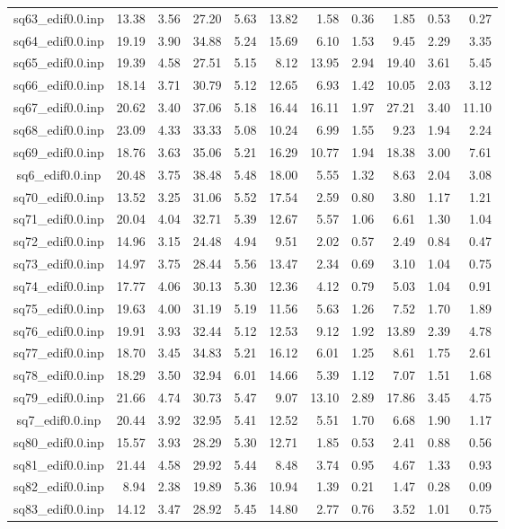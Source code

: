 {\begin{longtable}{@{}cr@{\hspace{1em}}r@{\hspace{1em}}r@{\hspace{1em}}r@{\hspace{1em}}r@{\hspace{2em}}r@{\hspace{1em}}r@{\hspace{1em}}r@{\hspace{1em}}r@{\hspace{1em}}r@{}}
sq63\_edif0.0.inp&13.38&3.56&27.20&5.63&13.82&1.58&0.36&1.85&0.53&0.27\\
sq64\_edif0.0.inp&19.19&3.90&34.88&5.24&15.69&6.10&1.53&9.45&2.29&3.35\\
sq65\_edif0.0.inp&19.39&4.58&27.51&5.15&8.12&13.95&2.94&19.40&3.61&5.45\\
sq66\_edif0.0.inp&18.14&3.71&30.79&5.12&12.65&6.93&1.42&10.05&2.03&3.12\\
sq67\_edif0.0.inp&20.62&3.40&37.06&5.18&16.44&16.11&1.97&27.21&3.40&11.10\\
sq68\_edif0.0.inp&23.09&4.33&33.33&5.08&10.24&6.99&1.55&9.23&1.94&2.24\\
sq69\_edif0.0.inp&18.76&3.63&35.06&5.21&16.29&10.77&1.94&18.38&3.00&7.61\\
sq6\_edif0.0.inp&20.48&3.75&38.48&5.48&18.00&5.55&1.32&8.63&2.04&3.08\\
sq70\_edif0.0.inp&13.52&3.25&31.06&5.52&17.54&2.59&0.80&3.80&1.17&1.21\\
sq71\_edif0.0.inp&20.04&4.04&32.71&5.39&12.67&5.57&1.06&6.61&1.30&1.04\\
sq72\_edif0.0.inp&14.96&3.15&24.48&4.94&9.51&2.02&0.57&2.49&0.84&0.47\\
sq73\_edif0.0.inp&14.97&3.75&28.44&5.56&13.47&2.34&0.69&3.10&1.04&0.75\\
sq74\_edif0.0.inp&17.77&4.06&30.13&5.30&12.36&4.12&0.79&5.03&1.04&0.91\\
sq75\_edif0.0.inp&19.63&4.00&31.19&5.19&11.56&5.63&1.26&7.52&1.70&1.89\\
sq76\_edif0.0.inp&19.91&3.93&32.44&5.12&12.53&9.12&1.92&13.89&2.39&4.78\\
sq77\_edif0.0.inp&18.70&3.45&34.83&5.21&16.12&6.01&1.25&8.61&1.75&2.61\\
sq78\_edif0.0.inp&18.29&3.50&32.94&6.01&14.66&5.39&1.12&7.07&1.51&1.68\\
sq79\_edif0.0.inp&21.66&4.74&30.73&5.47&9.07&13.10&2.89&17.86&3.45&4.75\\
sq7\_edif0.0.inp&20.44&3.92&32.95&5.41&12.52&5.51&1.70&6.68&1.90&1.17\\
sq80\_edif0.0.inp&15.57&3.93&28.29&5.30&12.71&1.85&0.53&2.41&0.88&0.56\\
sq81\_edif0.0.inp&21.44&4.58&29.92&5.44&8.48&3.74&0.95&4.67&1.33&0.93\\
sq82\_edif0.0.inp&8.94&2.38&19.89&5.36&10.94&1.39&0.21&1.47&0.28&0.09\\
sq83\_edif0.0.inp&14.12&3.47&28.92&5.45&14.80&2.77&0.76&3.52&1.01&0.75\\

\end{longtable}}
